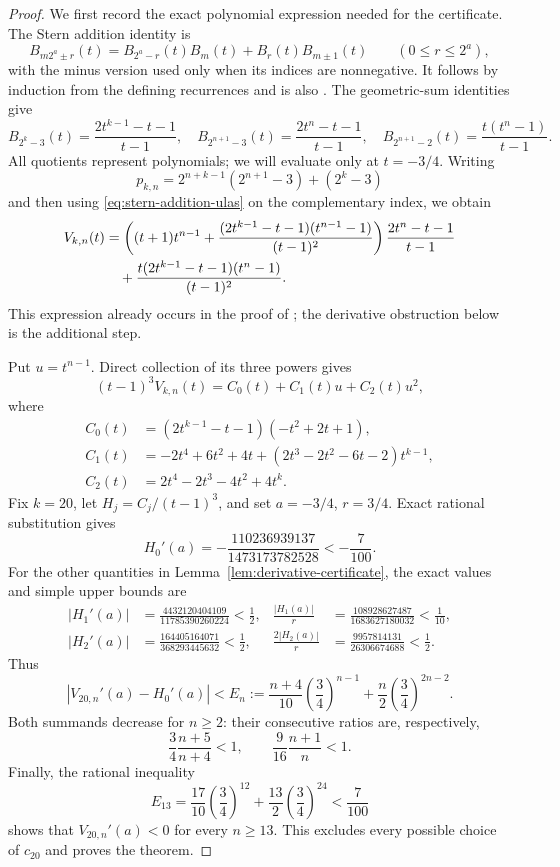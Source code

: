\documentclass[11pt,a4paper]{article}
\theoremstyle{definition}\newtheorem{definition}[lemma]{Definition}
\theoremstyle{remark}\newtheorem{remark}[lemma]{Remark}
\begin{document}
\begin{proof}
We first record the exact polynomial expression needed for the certificate.
The Stern addition identity is
\begin{equation}\label{eq:stern-addition-ulas}
 B_{m2^a\pm r}(t)=B_{2^a-r}(t)B_m(t)+B_r(t)B_{m\pm1}(t)
 \qquad(0\leq r\leq2^a),
\end{equation}
with the minus version used only when its indices are nonnegative.
It follows by induction from the defining recurrences and is also
\cite[Lemma~2.1]{Ulas20}. The geometric-sum identities give
\[
 B_{2^k-3}(t)=\frac{2t^{k-1}-t-1}{t-1},\quad
 B_{2^{n+1}-3}(t)=\frac{2t^n-t-1}{t-1},\quad
 B_{2^{n+1}-2}(t)=\frac{t(t^n-1)}{t-1}.
\]
All quotients represent polynomials; we will evaluate only at $t=-3/4$.
Writing
\[
 p_{k,n}=2^{n+k-1}(2^{n+1}-3)+(2^k-3)
\]
and then using \eqref{eq:stern-addition-ulas} on the complementary index,
we obtain
\begin{align}
 V_{k,n}(t)
 &=\left((t+1)t^{n-1}
       +\frac{(2t^{k-1}-t-1)(t^{n-1}-1)}{(t-1)^2}\right)
       \frac{2t^n-t-1}{t-1}\notag\\
 &\quad+\frac{t(2t^{k-1}-t-1)(t^n-1)}{(t-1)^2}.
 \label{eq:ulas-exact-expression}
\end{align}
This expression already occurs in the proof of
\cite[Theorem~2.3]{Ulas20}; the derivative obstruction below is the additional
step.

Put $u=t^{n-1}$. Direct collection of its three powers gives
\begin{equation}\label{eq:ulas-three-powers}
 (t-1)^3V_{k,n}(t)=C_0(t)+C_1(t)u+C_2(t)u^2,
\end{equation}
where
\begin{align*}
 C_0(t)&=(2t^{k-1}-t-1)(-t^2+2t+1),\\
 C_1(t)&=-2t^4+6t^2+4t
              +(2t^3-2t^2-6t-2)t^{k-1},\\
 C_2(t)&=2t^4-2t^3-4t^2+4t^k.
\end{align*}
Fix $k=20$, let $H_j=C_j/(t-1)^3$, and set $a=-3/4$, $r=3/4$.
Exact rational substitution gives
\[
 H_0'(a)=-\frac{110236939137}{1473173782528}<-\frac7{100}.
\]
For the other quantities in Lemma~\ref{lem:derivative-certificate}, the
exact values and simple upper bounds are
\begin{align*}
 |H_1'(a)|&=\frac{4432120404109}{11785390260224}<\frac12,&
 \frac{|H_1(a)|}{r}&=\frac{108928627487}{1683627180032}<\frac1{10},\\
 |H_2'(a)|&=\frac{164405164071}{368293445632}<\frac12,&
 \frac{2|H_2(a)|}{r}&=\frac{9957814131}{26306674688}<\frac12.
\end{align*}
Thus
\[
 |V_{20,n}'(a)-H_0'(a)|
 <E_n:=\frac{n+4}{10}\left(\frac34\right)^{n-1}
             +\frac n2\left(\frac34\right)^{2n-2}.
\]
Both summands decrease for $n\geq2$: their consecutive ratios are,
respectively,
\[
 \frac34\frac{n+5}{n+4}<1,\qquad
 \frac9{16}\frac{n+1}{n}<1.
\]
Finally, the rational inequality
\[
 E_{13}=\frac{17}{10}\left(\frac34\right)^{12}
             +\frac{13}{2}\left(\frac34\right)^{24}<\frac7{100}
\]
shows that $V_{20,n}'(a)<0$ for every $n\geq13$. This excludes every
possible choice of $c_{20}$ and proves the theorem.
\end{proof}
\end{document}
